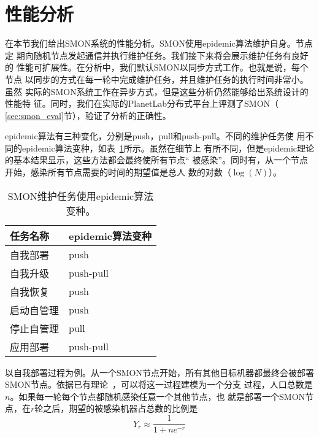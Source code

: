 \section{性能分析}
\label{sec:smon_analysis}

在本节我们给出SMON系统的性能分析。SMON使用epidemic算法维护自身。节点定
期向随机节点发起通信并执行维护任务。我们接下来将会展示维护任务有良好的
性能可扩展性。在分析中，我们默认SMON以同步方式工作。也就是说，每个节点
以同步的方式在每一轮中完成维护任务，并且维护任务的执行时间非常小。虽然
实际的SMON系统工作在异步方式，但是这些分析仍然能够给出系统设计的性能特
征。同时，我们在实际的PlanetLab分布式平台上评测了SMON（
\ref{sec:smon_eval}节），验证了分析的正确性。

epidemic算法有三种变化，分别是push，pull和push-pull。不同的维护任务使
用不同的epidemic算法变种，如表~\ref{fig:smon_tasks}所示。虽然在细节上
有所不同，但是epidemic理论的基本结果显示，这些方法都会最终使所有节点“
被感染”。同时有，从一个节点开始，感染所有节点需要的时间的期望值是总人
数的对数（$\log(N)$）。

\begin{table}
\centering
\caption{SMON维护任务使用epidemic算法变种。}
\label{fig:smon_tasks}
\begin{tabular}{ll}

\toprule[1.5pt]
任务名称 & epidemic算法变种 \\
\midrule[1pt]
自我部署 & push \\

自我升级 & push-pull \\

自我恢复 & push \\

启动自管理 & push \\

停止自管理 & pull \\

应用部署 & push-pull \\

\bottomrule[1.5pt]
\end{tabular}
\end{table}


以自我部署过程为例。从一个SMON节点开始，所有其他目标机器都最终会被部署
SMON节点。依据已有理论~\cite{Bailey1975}，可以将这一过程建模为一个分支
过程，人口总数是$n$。如果每一轮每个节点都随机感染任意一个其他节点，也
就是部署一个SMON节点，在$r$轮之后，期望的被感染机器占总数的比例是
\begin{equation*}
Y_r \approx \frac{1}{1+ne^{-r}} 
\end{equation*}

